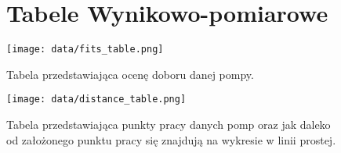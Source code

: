 \thispagestyle{empty}
\newcolumntype{C}{>{\centering\arraybackslash}}
\begin{figure}
    \section{Tabele Wynikowo-pomiarowe}
    \texttt{[image: data/fits\_table.png]}
    \caption{Tabela przedstawiająca ocenę doboru danej pompy.}
\end{figure}

\begin{figure}
    \texttt{[image: data/distance\_table.png]}
    \caption{Tabela przedstawiająca punkty pracy danych pomp oraz jak daleko od założonego punktu pracy się znajdują na wykresie w linii prostej. }
\end{figure}